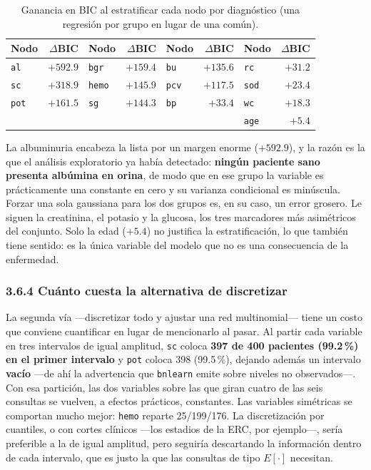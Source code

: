 \documentclass[11pt, a4paper]{article}
\begin{document}
\begin{table}[H]
\centering
\caption{Ganancia en BIC al estratificar cada nodo por diagnóstico (una regresión por grupo en
lugar de una común).}
\label{tab:estratif}
\small
\setlength{\tabcolsep}{4.5pt}
\begin{tabular}{l r l r l r l r}
\toprule
\textbf{Nodo} & \textbf{$\Delta$BIC} & \textbf{Nodo} & \textbf{$\Delta$BIC} &
\textbf{Nodo} & \textbf{$\Delta$BIC} & \textbf{Nodo} & \textbf{$\Delta$BIC} \\
\midrule
\texttt{al}   & $+592.9$ & \texttt{bgr}  & $+159.4$ & \texttt{bu}  & $+135.6$ & \texttt{rc}  & $+31.2$ \\
\texttt{sc}   & $+318.9$ & \texttt{hemo} & $+145.9$ & \texttt{pcv} & $+117.5$ & \texttt{sod} & $+23.4$ \\
\texttt{pot}  & $+161.5$ & \texttt{sg}   & $+144.3$ & \texttt{bp}  & $+33.4$  & \texttt{wc}  & $+18.3$ \\
              &          &               &          &              &          & \texttt{age} & $+5.4$  \\
\bottomrule
\end{tabular}
\end{table}

La albuminuria encabeza la lista por un margen enorme ($+592.9$), y la razón es la que el análisis
exploratorio ya había detectado: \textbf{ningún paciente sano presenta albúmina en orina}, de modo
que en ese grupo la variable es prácticamente una constante en cero y su varianza condicional es
minúscula. Forzar una sola gaussiana para los dos grupos es, en su caso, un error grosero. Le
siguen la creatinina, el potasio y la glucosa, los tres marcadores más asimétricos del conjunto.
Solo la edad ($+5.4$) no justifica la estratificación, lo que también tiene sentido: es la única
variable del modelo que no es una consecuencia de la enfermedad.

\subsubsection*{3.6.4 Cuánto cuesta la alternativa de discretizar}

La segunda vía —discretizar todo y ajustar una red multinomial— tiene un costo que conviene
cuantificar en lugar de mencionarlo al pasar. Al partir cada variable en tres intervalos de igual
amplitud, \texttt{sc} coloca \textbf{397 de 400 pacientes (99.2\,\%) en el primer intervalo} y
\texttt{pot} coloca 398 (99.5\,\%), dejando además un intervalo \textbf{vacío} —de ahí la
advertencia que \texttt{bnlearn} emite sobre niveles no observados—. Con esa partición, las dos
variables sobre las que giran cuatro de las seis consultas se vuelven, a efectos prácticos,
constantes. Las variables simétricas se comportan mucho mejor: \texttt{hemo} reparte 25/199/176.
La discretización por cuantiles, o con cortes clínicos —los estadios de la ERC, por ejemplo—,
sería preferible a la de igual amplitud, pero seguiría descartando la información dentro de cada
intervalo, que es justo la que las consultas de tipo $E[\cdot]$ necesitan.
\end{document}
